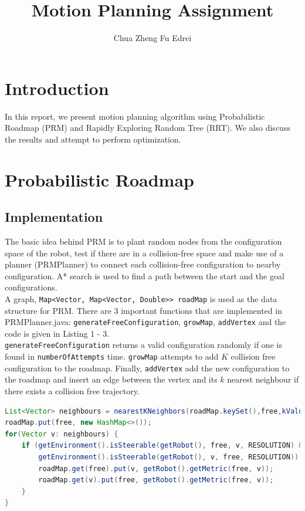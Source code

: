 \documentclass[9.5pt]{extarticle}
\title{Motion Planning Assignment}
\author{Chua Zheng Fu Edrei}
\begin{document}
\maketitle

\section{Introduction}

In this report, we present motion planning algorithm using Probabilistic Roadmap (PRM) and Rapidly Exploring Random Tree (RRT). We also discuss the results and attempt to perform optimization.

\section{Probabilistic Roadmap}

\subsection{Implementation}

The basic idea behind PRM is to plant random nodes from the configuration space of the robot, test if there are in a collision-free space and make use of a planner (PRMPlanner) to connect each collision-free configuration to nearby configuration. A* search is used to find a path between the start and the goal configurations. \\

A graph, \verb`Map<Vector, Map<Vector, Double>> roadMap` is used as the data structure for PRM. There are 3 important functions that are implemented in PRMPlanner.java: \verb`generateFreeConfiguration`, \verb`growMap`, \verb`addVertex` and the code is given in Listing 1 - 3.\\

\verb`generateFreeConfiguration` returns a valid configuration randomly if one is found in \verb`numberOfAttempts` time.  \verb`growMap` attempts to add $K$ collision free configuration to the roadmap. Finally, \verb`addVertex` add the new configuration to the roadmap and insert an edge between the vertex and its $k$ nearest neighbour if there exists a collision free trajectory.\\

\begin{lstlisting}[language=java,caption={Java code for addVertex}]
List<Vector> neighbours = nearestKNeighbors(roadMap.keySet(),free,kValue());
roadMap.put(free, new HashMap<>());
for(Vector v: neighbours) {
	if (getEnvironment().isSteerable(getRobot(), free, v, RESOLUTION) &&
		getEnvironment().isSteerable(getRobot(), v, free, RESOLUTION)) {
		roadMap.get(free).put(v, getRobot().getMetric(free, v));
		roadMap.get(v).put(free, getRobot().getMetric(free, v));
	}
}
\end{lstlisting}
\end{document}
